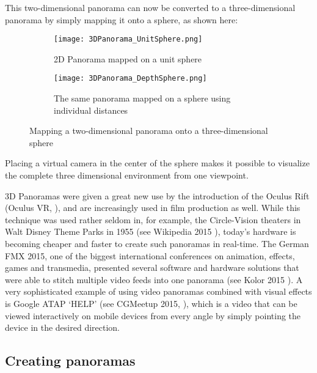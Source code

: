 This two-dimensional panorama can now be converted to a three-dimensional panorama by simply mapping it onto a sphere, as shown here:

\pagestyle{fancy}

\begin{figure}[h]
	\centering
	\begin{subfigure}[b]{0.45\textwidth}
		\centering
		\texttt{[image: 3DPanorama\_UnitSphere.png]}
		\caption{2D Panorama mapped on a unit sphere}
		\label{fig:3d_panorama_unit_sphere}
	\end{subfigure}
	\hfill
	\begin{subfigure}[b]{0.45\textwidth}
		\centering
		\texttt{[image: 3DPanorama\_DepthSphere.png]}
		\caption{The same panorama mapped on a sphere using individual distances}
		\label{fig:3d_panorama_depth_sphere}
	\end{subfigure}

	\caption{Mapping a two-dimensional panorama onto a three-dimensional sphere}
	\label{fig:3d_panorama}
\end{figure}

Placing a virtual camera in the center of the sphere makes it possible to visualize the complete three dimensional environment from one viewpoint.

3D Panoramas were given a great new use by the introduction of the Oculus Rift  (Oculus VR, \parencite{OculusVR}), and are increasingly used in film production as well. While this technique was used rather seldom in, for example, the Circle-Vision theaters in Walt Disney Theme Parks in 1955 (see Wikipedia 2015 \parencite{wiki:CircleVision}), today's hardware is becoming cheaper and faster to create such panoramas in real-time. The German FMX 2015, one of the biggest international conferences on animation, effects, games and transmedia, presented several software and hardware solutions that were able to stitch multiple video feeds into one panorama (see Kolor 2015 \parencite{kolorGoPro}). A very sophisticated example of using video panoramas combined with visual effects is Google ATAP ‘HELP’ (see CGMeetup 2015, \parencite{googleATAPHelp}), which is a video that can be viewed interactively on mobile devices from every angle by simply pointing the device in the desired direction.

\subsection{Creating panoramas} \label{section_creating_panoramas}

